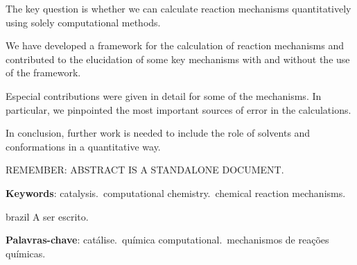 \setlength{\absparsep}{18pt} %

\begin{resumo}[Abstract]
The key question is whether we can calculate reaction mechanisms quantitatively
using solely computational methods.

We have developed a framework for the calculation of reaction mechanisms and
contributed to the elucidation of some key mechanisms with and without the use
of the framework.

Especial contributions were given in detail for some of the mechanisms.
In particular, we pinpointed the most important sources of error in the
calculations.

In conclusion, further work is needed to include the role of solvents and
conformations in a quantitative way.

REMEMBER: ABSTRACT IS A STANDALONE DOCUMENT.

\vspace{\onelineskip}

\noindent
\textbf{Keywords}: catalysis.\ computational chemistry.\ chemical reaction mechanisms.
\end{resumo}

\begin{resumo}[Resumo]
\begin{otherlanguage*}{brazil}
A ser escrito.

\vspace{\onelineskip}

\noindent
\textbf{Palavras-chave}: catálise.\ química computational.\ mechanismos de
reações químicas.
\end{otherlanguage*}
\end{resumo}
